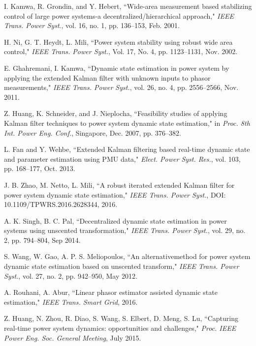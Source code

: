 \documentclass[10pt]{IEEEtran}
\begin{document}
\ifCLASSOPTIONcaptionsoff
  \newpage
\fi

\begin{thebibliography}{99}
I. Kamwa, R. Grondin, and Y. Hebert, ``Wide-area measurement based stabilizing control of large power systems-a decentralized/hierarchical approach," \emph{IEEE Trans. Power Syst}., vol. 16, no. 1, pp. 136--153, Feb. 2001.

H. Ni, G. T. Heydt, L. Mili, ``Power system stability using robust wide area control," \emph{IEEE Trans. Power Syst.}, Vol. 17, No. 4, pp. 1123--1131, Nov. 2002.

E. Ghahremani, I. Kamwa, ``Dynamic state estimation in power system by applying the extended Kalman filter with unknown inputs to phasor measurements," \emph{IEEE Trans. Power Syst.}, vol. 26, no. 4, pp. 2556--2566, Nov. 2011.

Z. Huang, K. Schneider, and J. Nieplocha, ``Feasibility studies of applying Kalman filter techniques to power system dynamic state estimation," in \emph{Proc. 8th Int. Power Eng. Conf.}, Singapore, Dec. 2007, pp. 376--382.

L. Fan and Y. Wehbe, ``Extended Kalman filtering based real-time dynamic state and parameter estimation using PMU data," \emph{Elect. Power Syst. Res.}, vol. 103, pp. 168--177, Oct. 2013.

J. B. Zhao, M. Netto, L. Mili, ``A robust iterated extended Kalman filter for power system dynamic state estimation," \emph{IEEE Trans. Power Syst.}, DOI: 10.1109/TPWRS.2016.2628344, 2016.

A. K. Singh, B. C. Pal, ``Decentralized dynamic state estimation in power systems using unscented transformation," \emph{IEEE Trans. Power Syst.}, vol. 29, no. 2, pp. 794--804, Sep 2014.

S. Wang, W. Gao, A. P. S. Meliopoulos, ``An alternativemethod for power system dynamic state estimation based on unscented transform," \emph{IEEE Trans. Power Syst.}, vol. 27, no. 2, pp. 942--950, May 2012.

A. Rouhani, A. Abur, ``Linear phasor estimator assisted dynamic state estimation," \emph{IEEE Trans. Smart Grid}, 2016.

Z. Huang, N. Zhou, R. Diao, S. Wang, S. Elbert, D. Meng, S. Lu, ``Capturing real-time power system dynamics: opportunities and challenges," \emph{Proc. IEEE Power Eng. Soc. General Meeting}, July 2015.


\end{thebibliography}
\end{document}
